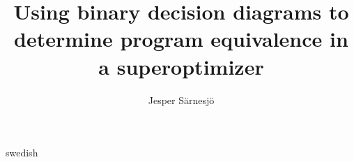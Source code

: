 \documentclass[a4paper,11pt]{kth-mag}
\title{Using binary decision diagrams to determine program equivalence in a superoptimizer}
\subtitle{}
\author{Jesper Särnesjö}
\date{}
\begin{document}
\frontmatter

\pagestyle{empty}

\removepagenumbers

\maketitle


\begin{abstract}
\end{abstract}

\clearpage

\begin{foreignabstract}{swedish}
\end{foreignabstract}

\clearpage

\tableofcontents*

\mainmatter

\pagestyle{newchap}

\nocite{*} %



\appendix
\addappheadtotoc
\end{document}
